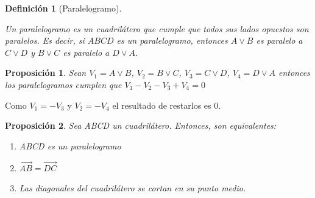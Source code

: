 \documentclass[11pt, a4paper]{article}
\makeatletter
\newif\IfInSansMode
\let\oldsf\sffamily
\renewcommand*{\sffamily}{\oldsf\mathversion{sans}\InSansModetrue}
\let\oldnorm\normalfont
\renewcommand*{\normalfont}{\oldnorm\InSansModefalse\mathversion{normal}}
\renewenvironment{proof}[1][\proofname] {\vspace{-15pt}\par\pushQED{\qed}\normalfont\topsep6\p@\@plus6\p@\relax\trivlist\item[\hskip\labelsep\it#1\@addpunct{.}]\ignorespaces}{\popQED\endtrivlist\@endpefalse}
\renewcommand{\vec}{\overrightarrow}
\renewenvironment{proof}[1][\proofname] {\par\pushQED{\qed}\normalfont\topsep6\p@\@plus6\p@\relax\trivlist\item[\hskip\labelsep\itshape\sffamily#1\@addpunct{.}]\ignorespaces}{\popQED\endtrivlist\@endpefalse}
\theoremstyle{theorem-style}
\newtheorem{nprop}{Proposición}[section]
\theoremstyle{definition-style}
\newtheorem{ndef}{Definición}[section]
\theoremstyle{remark-style}
\theoremstyle{example-style}
\newenvironment{nlist}
{\begin{enumerate}
    \renewcommand\labelenumi{(\emph{\roman{enumi})}}}
  {\end{enumerate}}
\makeatother
\begin{document}
\begin{ndef}[Paralelogramo]\hfill\\
\begin{minipage}[c]{0.70\textwidth}
  Un paralelogramo es un cuadrilátero que cumple que todos sus lados opuestos son paralelos. Es decir, si $ABCD$ es un
  paralelogramo, entonces $A \vee B$ es paralelo a $C \vee D$ y $B \vee C$ es paralelo a $D \vee A$.
\end{minipage}\hfill
\begin{minipage}[]{0.27\textwidth}
  \sffamily
\end{minipage}
\end{ndef}

\hfill


\begin{nprop}
	Sean $V_{1} = A \vee B$, $V_{2} = B \vee C$, $V_{3} = C\vee D$, $V_{4} = D \vee A$ entonces los paralelogramos cumplen que $V_{1} - V_{2} - V_{3} + V_{4} = 0$
 
\end{nprop}

\begin{proof} \hfill
	
		 Como $V_1 = -V_3$ y $V_2 =-V_4$ el resultado de restarlos es $0$.
\end{proof}


\begin{nprop}
  Sea ABCD un cuadrilátero. Entonces, son equivalentes:
  \begin{nlist}
  \item ABCD es un paralelogramo
  \item $\vec{AB} = \vec{DC}$
  \item Las diagonales del cuadrilátero se cortan en su punto medio.
  \end{nlist}
\end{nprop}
\end{document}

